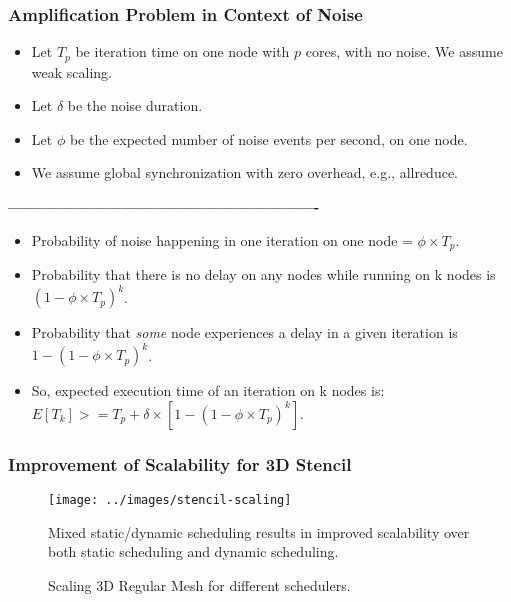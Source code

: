 \begin{frame}[label=noiseampformula]
\frametitle{Amplification Problem in Context of Noise} 
\begin{itemize}
\small \item \small Let $T_p$ be iteration time on one node with $p$ cores, with no noise. We assume weak scaling. 
\item \small  Let $\delta$ be the noise duration.
\item \small Let $\phi$ be the expected number of noise events per second, on one node. \item \small We assume global synchronization with zero overhead, e.g., allreduce.
\end{itemize}

\textbf{----------------------------------------------------------}
\begin{itemize}
\small \item \small Probability of noise happening in one iteration on one node = $\phi \times T_p$. 
\item \small Probability that there is no delay on any nodes while running on k nodes is $(1 - \phi \times T_p)^k$. 
\item \small Probability that \textit{some} node experiences a delay in a given iteration is $1 - (1- \phi \times T_p)^k$. 
\item \small So, expected execution time of an iteration on k nodes is: $E[T_k]  >=  T_p + \delta \times  [1 - (1- \phi \times T_p)^k]$. 
\end{itemize}
\end{frame}

\begin{frame}
\frametitle{Improvement of Scalability for 3D Stencil}
\begin{figure}
\texttt{[image: ../images/stencil-scaling]}
\caption{Scaling 3D Regular Mesh for different schedulers.}
\begin{itemize}
\tiny {\item \tiny Mixed static/dynamic scheduling results in improved 
scalability over both static scheduling and dynamic scheduling.}
\end{itemize}
\end{figure}
\end{frame}

